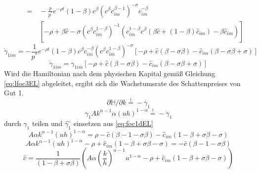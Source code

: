 \begin{equation*}
	\begin{split}
	\qquad=&~-\frac{p}{p^{^*}} e^{- \rho t} (1- \beta) c^{\beta}(c^{\beta} c_{im}^{\beta -1})^{- \sigma} c_{im}^{- \beta}\\
	&~\left[-\rho + \beta \hat{c} - \sigma(c^{\beta} c_{im}^{1- \beta})^{-1}(c_{im}^{1- \beta} c^{\beta}(\beta \hat{c} + (1- \beta) \hat{c}_{im}) - \beta \hat{c}_{im})\right]
\end{split}
\end{equation*}
\begin{equation}
\dot{\gamma}_{1im}=-\frac{1}{p^*}e^{-\rho t}(1-\beta) c^{\beta}c_{im}^{-\beta}(c^\beta c_{im}^{1-\beta})^{-\sigma}[-\rho+\hat{c}(\beta-\sigma\beta)-\hat{c}_{im}(\beta-\sigma\beta+\sigma)]\label{eq:lfoc1cim}
\end{equation}
\begin{equation}
\dot{\gamma}_{1im}=\gamma_{1im}[-\rho+\hat{c}(\beta-\sigma\beta)-\hat{c}_{im}(\beta-\sigma\beta+\sigma)]\label{eq:foc1cimEL}
\end{equation}
Wird die Hamiltonian nach dem physischen Kapital gemä{\ss} Gleichung \eqref{eq:lfoc3EL} abgeleitet, ergibt sich die Wachstumsrate des Schattenpreises von Gut 1.
\begin{equation*}
\partial\mathbb{H}/\partial k\overset{!}{=}-\dot{\gamma_1}
\end{equation*}
\begin{equation}
\gamma_{1}A k^{\alpha -1} \alpha(u h)^{1- \alpha}\overset{!}{=} - \dot{\gamma}_{1}\label{BedingungFoc3EL}
\end{equation}
durch $\gamma_1$ teilen und $\hat{\gamma_1}$ einsetzen aus \eqref{eq:foc1dEL}
\begin{equation*}
 A \alpha k^{\alpha -1} (uh)^{1- \alpha} =\rho-\hat{c}(\beta-1-\sigma\beta)-\hat{c}_{im}(1-\beta+\sigma\beta-\sigma)
\end{equation*}
\begin{equation*}
 A \alpha k^{\alpha -1} (uh)^{1- \alpha}-\rho+\hat{c}_{im}(1-\beta+\sigma\beta-\sigma)=-\hat{c}(\beta-1-\sigma\beta)
\end{equation*}
\begin{equation}
\boxed{
\hat{c}=\frac{1}{(1-\beta+\sigma\beta)}\left(A\alpha \left(\frac{k}{h}\right)^{\alpha -1}u^{1-\alpha}-\rho+\hat{c}_{im}(1-\beta+\sigma\beta-\sigma)\right)}\label{eq:lKRREL}
\end{equation}

